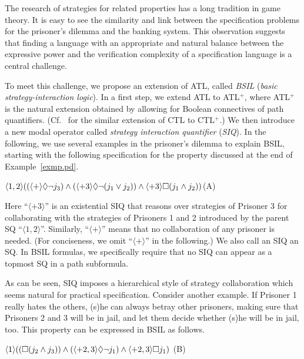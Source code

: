 The research of strategies for related properties has a long tradition in game theory.  
It is easy to 
see the similarity and link between the specification problems for the prisoner's dilemma and the banking system. 
This observation suggests that finding a language with an appropriate and natural 
balance between the expressive power and the verification complexity of a specification language is a central challenge.

To meet this challenge, we propose an extension of ATL,
called {\em BSIL} ({\em basic strategy-interaction logic}).
In a first step, we extend ATL to ATL$^+$, where ATL$^+$ is the natural extension obtained by allowing for Boolean connectives of path quantifiers.
(Cf.~\cite{BPM83,EC80} for the similar extension of CTL to CTL$^+$.)
We then introduce a new modal operator 
called {\em strategy interaction quantifier} ({\em SIQ}). 
In the following, we use several examples in the prisoner's dilemma 
to explain BSIL, starting with the following specification for the property discussed at the end of Example~\ref{exmp.pd}. 
\begin{center} 
\hfill $\langle 1,2\rangle((\langle+\rangle\Diamond\neg j_3)\wedge 
	(\langle +3\rangle \Diamond\neg (j_1\vee j_2))
	\wedge \langle+3\rangle \Box (j_1\wedge j_2))
$\hfill (A) 
\end{center} 
Here ``$\langle+3\rangle$'' is an existential SIQ that reasons over 
strategies of Prisoner 3 for collaborating with the strategies  
of Prisoners 1 and 2 introduced by the parent SQ ``$\langle 1,2\rangle$''. 
Similarly, ``$\langle+\rangle$'' means that 
no collaboration of any prisoner is needed. 
(For conciseness, we omit ``$\langle+\rangle$'' in the following.)  \label{reply1.null.siq1} 
We also call an SIQ an SQ.  
In BSIL formulas, we specifically require that no SIQ can appear 
as a topmost SQ in a path subformula.  

As can be seen, SIQ imposes a hierarchical style of strategy collaboration 
which seems natural for practical specification.  
Consider another example.  
If Prisoner 1 really hates the others, 
(s)he can always betray other prisoners,  
making sure that Prisoners 2 and 3 will be in jail, and let them 
decide whether (s)he will be in jail, too.  
This property can be expressed in BSIL as follows. 
\begin{center} 
\hfill 
$\langle 1\rangle((\Box (j_2\wedge j_3))\wedge 
	(\langle +2,3\rangle \Diamond\neg j_1)
	\wedge \langle+2,3\rangle \Box j_1)
$
\hfill (B) 
\end{center} 

